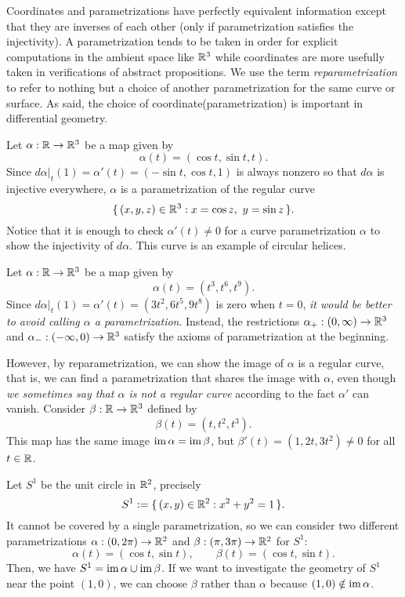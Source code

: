 \documentclass{../exp}
\def\a{\alpha}
\begin{document}
Coordinates and parametrizations have perfectly equivalent information except that they are inverses of each other (only if parametrization satisfies the injectivity).
A parametrization tends to be taken in order for explicit computations in the ambient space like $\mathbb{R}^3$ while coordinates are more usefully taken in verifications of abstract propositions.
We use the term \emph{reparametrization} to refer to nothing but a choice of another parametrization for the same curve or surface.
As said, the choice of coordinate(parametrization) is important in differential geometry.

\begin{exs}
\item
Let $\a:\R\to\R^3$ be a map given by
\[\a(t)=(\cos t,\sin t, t).\]
Since $d\a|_t(1)=\a'(t)=(-\sin t,\cos t,1)$ is always nonzero so that $d\a$ is injective everywhere, $\a$ is a parametrization of the regular curve
\[\{\,(x,y,z)\in\mathbb{R}^3:x=\cos z,\ y=\sin z\,\}.\]
Notice that it is enough to check $\a'(t)\ne0$ for a curve parametrization $\a$ to show the injectivity of $d\a$.
This curve is an example of circular helices.

\item
Let $\a:\R\to\R^3$ be a map given by
\[\a(t)=(t^3,t^6,t^9).\]
Since $d\a|_t(1)=\a'(t)=(3t^2,6t^5,9t^8)$ is zero when $t=0$, \emph{it would be better to avoid calling $\a$ a parametrization}.
Instead, the restrictions $\a_+:(0,\infty)\to\R^3$ and $\a_-:(-\infty,0)\to\R^3$ satisfy the axioms of parametrization at the beginning.

However, by reparametrization, we can show the image of $\a$ is a regular curve, that is, we can find a parametrization that shares the image with $\a$, even though \emph{we sometimes say that $\a$ is not a regular curve} according to the fact $\a'$ can vanish.
Consider $\beta:\R\to\R^3$ defined by
\[\beta(t)=(t,t^2,t^3).\]
This map has the same image $\im\a=\im\beta$, but $\beta'(t)=(1,2t,3t^2)\ne0$ for all $t\in\mathbb{R}$.

\item
Let $S^1$ be the unit circle in $\mathbb{R}^2$, precisely
\[S^1:=\{\,(x,y)\in\mathbb{R}^2:x^2+y^2=1\,\}.\]
It cannot be covered by a single parametrization, so we can consider two different parametrizations $\a:(0,2\pi)\to\R^2$ and $\beta:(\pi,3\pi)\to\R^2$ for $S^1$:
\[\alpha(t)=(\cos t,\sin t),\qquad\beta(t)=(\cos t,\sin t).\]
Then, we have $S^1=\im\a\cup\im\beta$.
If we want to investigate the geometry of $S^1$ near the point $(1,0)$, we can choose $\beta$ rather than $\a$ because $(1,0)\notin\im\a$.


\end{exs}
\end{document}
